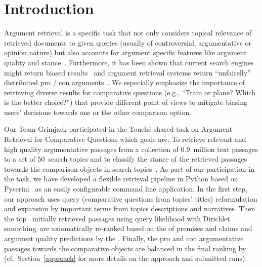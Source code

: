 \section{Introduction}\label{intro}

Argument retrieval is a specific task that not only considers topical relevance of retrieved documents to given queries (usually of controversial, argumentative or opinion nature) but also accounts for argument specific features like argument quality and stance~\cite{BondarenkoFBGAPBSWPH2020, BondarenkoGFBAPBSWPH2021}.  
Furthermore, it has been shown that current search engines might return biased results~\cite{ShahB2022} and argument retrieval systems return ``unfairelly'' distributed pro / con arguments~\cite{CherumanalSSC2021}. We especially emphasize the importance of retrieving diverse results for comparative questions (e.g., ``Train or plane? Which is the better choice?'') that provide different point of views to mitigate biasing users' decisions towards one or the other comparison option.


Our Team Grimjack participated in the Touch{\'e} shared task on Argument Retrieval for Comparative Questions which goals are: \Ni To retrieve relevant and high quality argumentative passages from a collection of 0.9~million text passages to a set of 50~search topics and \Nii to classify the stance of the retrieved passages towards the comparison objects in search topics~\cite{BondarenkoFKSGBPBSWPH2022}. As part of our participation in the task, we have developed a flexible retrieval pipeline in Python based on Pyserini~\cite{LinMLYPN2021} as an easily configurable command line application. In the first step, our approach uses query (comparative questions from topics' titles) reformulation and expansion by important terms from topics descriptions and narratives. Then the top~ initially retrieved passages using query likelihood with Dirichlet smoothing~\todocite are axiomatically re-ranked based on the  of premises and claims  and argument quality predictions by the . Finally, the pro and con argumentative passages towards the comparative objects are balanced in the final ranking by  (cf.\ Section~\ref{approach} for more details on the approach and submitted runs).

